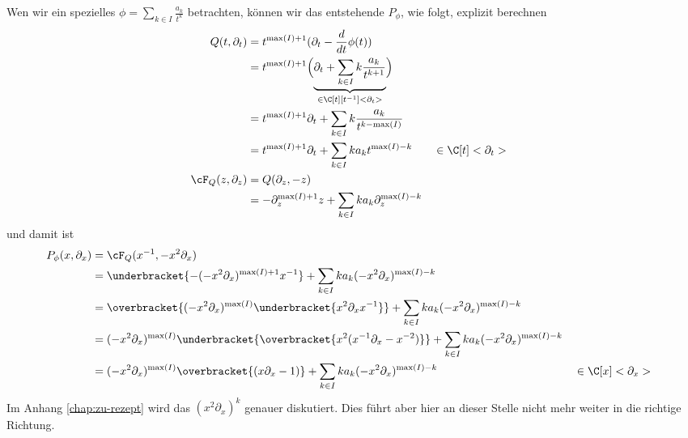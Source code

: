Wen wir ein spezielles $\phi=\sum_{k\in I}\frac{a_k}{t^{k}}$ betrachten, können
wir das entstehende $P_\phi$, wie folgt, explizit berechnen
\begin{align*}
Q(t,\partial_t) &= t^{\max(I)+1}(\partial_t-\frac{d}{dt}\phi(t))
\\&=t^{\max(I)+1}\Big(\underset{\in \C[t][t^{-1}]<\partial_t>}{\underbrace{
    \partial_t+\sum_{k\in I} k\frac{a_k}{t^{k+1}}}}\Big)
\\&=t^{\max(I)+1}\partial_t +\sum_{k\in I} k\frac{a_k}{t^{k-\max(I)}} 
\\&=t^{\max(I)+1}\partial_t +\sum_{k\in I}k a_k t^{\max(I)-k}
  & &\in \C[t]<\partial_t>
\\\cF_Q(z,\partial_z) &=Q(\partial_z,-z)
\\&=-\partial_z^{\max(I)+1}z +\sum_{k\in I}k a_k\partial_z^{\max(I)-k}
\end{align*}
und damit ist
\begin{align*}
P_{\phi}(x,\partial_x) &=\cF_Q(x^{-1},-x^2\partial_x)
\\&=\underbracket{-(-x^2\partial_x)^{\max(I)+1}x^{-1}}
  +\sum_{k\in I}k a_k(-x^2\partial_x)^{\max(I)-k}
\\&=\overbracket{(-x^2\partial_x)^{\max(I)} \underbracket{x^2\partial_xx^{-1}}}
   +\sum_{k\in I}k a_k(-x^2\partial_x)^{\max(I)-k}
\\&=(-x^2\partial_x)^{\max(I)}
   \underbracket{ \overbracket{x^2(x^{-1}\partial_x-x^{-2})} }
   +\sum_{k\in I}k a_k(-x^2\partial_x)^{\max(I)-k}
\\&=(-x^2\partial_x)^{\max(I)} \overbracket{(x\partial_x-1)}
   +\sum_{k\in I}k a_k(-x^2\partial_x)^{\max(I)-k}
  & &\in \C[x]<\partial_x>
\end{align*}
Im Anhang \ref{chap:zu-rezept} wird das $(x^2\partial_x)^{k}$ genauer
diskutiert. Dies führt aber hier an dieser Stelle nicht mehr weiter in die
richtige Richtung.

